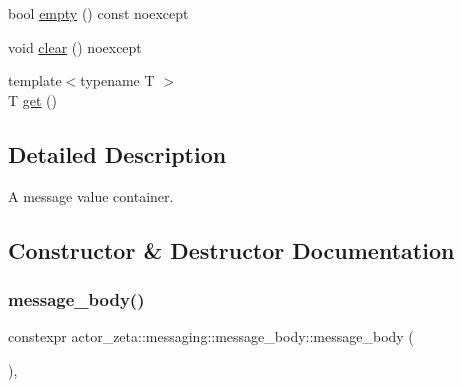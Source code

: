 \begin{DoxyCompactItemize}
\item 
bool \hyperlink{classactor__zeta_1_1messaging_1_1message__body_abb39cf12a11d34542bd82f9ebb0c8494}{empty} () const noexcept
\item 
void \hyperlink{classactor__zeta_1_1messaging_1_1message__body_a8025aae9833664bab4f5c4c6b5e9e228}{clear} () noexcept
\item 
{\footnotesize template$<$typename T $>$ }\\T \hyperlink{classactor__zeta_1_1messaging_1_1message__body_a34df3a10769c81d38765bb9d297c399c}{get} ()
\end{DoxyCompactItemize}


\subsection{Detailed Description}
A message value container. 

\subsection{Constructor \& Destructor Documentation}
\mbox{\label{classactor__zeta_1_1messaging_1_1message__body_a77305ae40c427a8b0e0736f13def4970}} 
\subsubsection{\texorpdfstring{message\+\_\+body()}{message\_body()}\hspace{0.1cm}{\footnotesize\ttfamily [1/5]}}
{\footnotesize\ttfamily constexpr actor\+\_\+zeta\+::messaging\+::message\+\_\+body\+::message\+\_\+body (\begin{DoxyParamCaption}{ }\end{DoxyParamCaption})\hspace{0.3cm}{\ttfamily [inline]}, {\ttfamily [noexcept]}}

\mbox{\label{classactor__zeta_1_1messaging_1_1message__body_a5fe3cdc95b1497e823b903357d5610e2}} 
